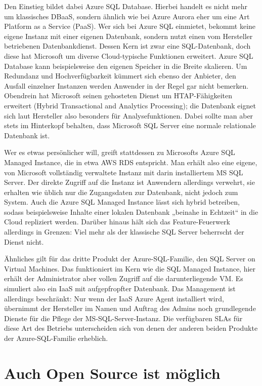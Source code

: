Den Einstieg bildet dabei Azure SQL Database. Hierbei handelt es nicht mehr um klassisches DBaaS, sondern ähnlich wie bei Azure Aurora eher um eine Art Platform as a Service (PaaS). Wer sich bei Azure SQL einmietet, bekommt keine eigene Instanz mit einer eigenen Datenbank, sondern nutzt einen vom Hersteller betriebenen Datenbankdienst. Dessen Kern ist zwar eine SQL-Datenbank, doch diese hat Microsoft um diverse Cloud-typische Funktionen erweitert. Azure SQL Database kann beispielsweise den eigenen Speicher in die Breite skalieren. Um Redundanz und Hochverfügbarkeit kümmert sich ebenso der Anbieter, den Ausfall einzelner Instanzen werden Anwender in der Regel gar nicht bemerken. Obendrein hat Microsoft seinen gehosteten Dienst um HTAP-Fähigkeiten erweitert (Hybrid Transactional and Analytics Processing); die Datenbank eignet sich laut Hersteller also besonders für Analysefunktionen. Dabei sollte man aber stets im Hinterkopf behalten, dass Microsoft SQL Server eine normale relationale Datenbank ist.

Wer es etwas persönlicher will, greift stattdessen zu Microsofts Azure SQL Managed Instance, die in etwa AWS RDS entspricht. Man erhält also eine eigene, von Microsoft vollständig verwaltete Instanz mit darin installiertem MS SQL Server. Der direkte Zugriff auf die Instanz ist Anwendern allerdings verwehrt, sie erhalten wie üblich nur die Zugangsdaten zur Datenbank, nicht jedoch zum System. Auch die Azure SQL Managed Instance lässt sich hybrid betreiben, sodass beispielsweise Inhalte einer lokalen Datenbank „beinahe in Echtzeit“ in die Cloud repliziert werden. Darüber hinaus hält sich das Feature-Feuerwerk allerdings in Grenzen: Viel mehr als der klassische SQL Server beherrscht der Dienst nicht.

Ähnliches gilt für das dritte Produkt der Azure-SQL-Familie, den SQL Server on Virtual Machines. Das funktioniert im Kern wie die SQL Managed Instance, hier erhält der Administrator aber vollen Zugriff auf die darunterliegende VM. Es simuliert also ein IaaS mit aufgepfropfter Datenbank. Das Management ist allerdings beschränkt: Nur wenn der IaaS Azure Agent installiert wird, übernimmt der Hersteller im Namen und Auftrag des Admins noch grundlegende Dienste für die Pflege der MS-SQL-Server-Instanz. Die verfügbaren SLAs für diese Art des Betriebs unterscheiden sich von denen der anderen beiden Produkte der Azure-SQL-Familie erheblich.

\section{Auch Open Source ist möglich}


